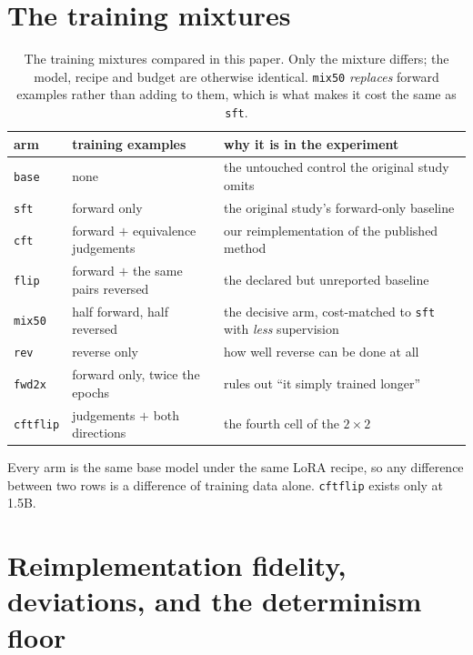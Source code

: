 \documentclass{article}
\newcommand{\arm}[1]{\texttt{#1}}
\begin{document}
\section{The training mixtures}
\label{app:arms}
\begin{table}[h]
\centering\small
\caption{The training mixtures compared in this paper. Only the mixture differs; the model,
recipe and budget are otherwise identical. \arm{mix50} \emph{replaces} forward examples
rather than adding to them, which is what makes it cost the same as \arm{sft}.}
\label{tab:arms}
\begin{tabular}{llp{6.6cm}}
\toprule
arm & training examples & why it is in the experiment \\
\midrule
\arm{base} & none & the untouched control the original study omits \\
\arm{sft} & forward only & the original study's forward-only baseline \\
\arm{cft} & forward $+$ equivalence judgements & our reimplementation of the published method \\
\arm{flip} & forward $+$ the same pairs reversed & the declared but unreported baseline \\
\arm{mix50} & half forward, half reversed & the decisive arm, cost-matched to \arm{sft} with \emph{less} supervision \\
\arm{rev} & reverse only & how well reverse can be done at all \\
\arm{fwd2x} & forward only, twice the epochs & rules out ``it simply trained longer'' \\
\arm{cftflip} & judgements $+$ both directions & the fourth cell of the $2\times2$ \\
\bottomrule
\end{tabular}
\end{table}
Every arm is the same base model under the same LoRA recipe, so any difference between two
rows is a difference of training data alone. \arm{cftflip} exists only at 1.5B.

\section{Reimplementation fidelity, deviations, and the determinism floor}
\label{app:fidelity}
\end{document}
